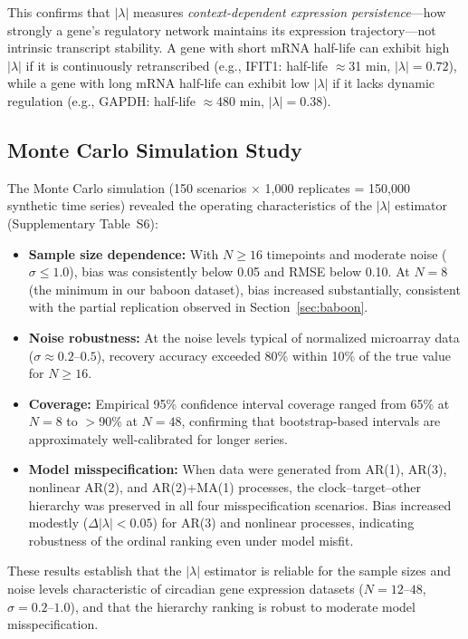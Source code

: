 \documentclass[11pt,letterpaper]{article}
\begin{document}
This confirms that $|\lambda|$ measures \textit{context-dependent expression persistence}---how strongly a gene's regulatory network maintains its expression trajectory---not intrinsic transcript stability. A gene with short mRNA half-life can exhibit high $|\lambda|$ if it is continuously retranscribed (e.g., IFIT1: half-life $\approx$31 min, $|\lambda| = 0.72$), while a gene with long mRNA half-life can exhibit low $|\lambda|$ if it lacks dynamic regulation (e.g., GAPDH: half-life $\approx$480 min, $|\lambda| = 0.38$).

\subsection{Monte Carlo Simulation Study}
\label{sec:montecarlo-results}

The Monte Carlo simulation (150 scenarios $\times$ 1,000 replicates = 150,000 synthetic time series) revealed the operating characteristics of the $|\lambda|$ estimator (Supplementary Table~S6):

\begin{itemize}
\item \textbf{Sample size dependence:} With $N \geq 16$ timepoints and moderate noise ($\sigma \leq 1.0$), bias was consistently below 0.05 and RMSE below 0.10. At $N = 8$ (the minimum in our baboon dataset), bias increased substantially, consistent with the partial replication observed in Section~\ref{sec:baboon}.
\item \textbf{Noise robustness:} At the noise levels typical of normalized microarray data ($\sigma \approx 0.2$--$0.5$), recovery accuracy exceeded 80\% within 10\% of the true value for $N \geq 16$.
\item \textbf{Coverage:} Empirical 95\% confidence interval coverage ranged from 65\% at $N = 8$ to $>$90\% at $N = 48$, confirming that bootstrap-based intervals are approximately well-calibrated for longer series.
\item \textbf{Model misspecification:} When data were generated from AR(1), AR(3), nonlinear AR(2), and AR(2)+MA(1) processes, the clock--target--other hierarchy was preserved in all four misspecification scenarios. Bias increased modestly ($\Delta|\lambda| < 0.05$) for AR(3) and nonlinear processes, indicating robustness of the ordinal ranking even under model misfit.
\end{itemize}

These results establish that the $|\lambda|$ estimator is reliable for the sample sizes and noise levels characteristic of circadian gene expression datasets ($N = 12$--$48$, $\sigma = 0.2$--$1.0$), and that the hierarchy ranking is robust to moderate model misspecification.
\end{document}
